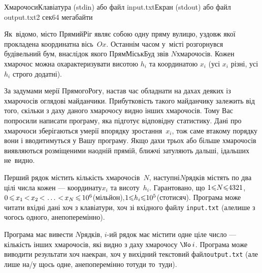 \vspace{10mm}\par
\begin{problem}{Хмарочоси}{Клавіатура (stdin) або файл input.txt}{Екран (stdout) або файл output.txt}{2 сек}{64 мегабайти}

Як~відомо, місто Прямий\nolinebreak[2] Ріг являє собою одну пряму вулицю, уздовж якої прокладена координатна вісь~$Ox$. Останнім часом у~місті розгорнувся будівельний бум, внаслідок якого ПрямМіськБуд звів $N$\nolinebreak[3] хмарочосів. Кожен хмарочос можна охарактеризувати висотою $h_i$ та координатою $x_i$ (усі $x_i$ різні, усі $h_i$ строго додатні).

За задумами мерії Прямого\nolinebreak[2] Рогу, настав час обладнати на дахах деяких із хмарочосів оглядові майданчики. Прибутковість такого майданчику залежить від того, скільки з даху даного хмарочосу видно інших хмарочосів. Тому Вас попросили написати програму, яка підготує відповідну статистику. Дані про хмарочоси зберігаються у\nolinebreak[3] мерії в\nolinebreak[3] порядку зростання~$x_i$, тож саме в\nolinebreak[3] такому порядку вони і вводитимуться у Вашу програму. Якщо дахи трьох або більше хмарочосів виявляються розміщеними на\nolinebreak[2] одній прямій, ближчі затуляють дальші, і\nolinebreak[3] дальших не~видно.

\InputFile
Перший рядок містить кількість хмарочосів~$N$, наступні\nolinebreak[2] $N$\nolinebreak[3] рядків містять по два цілі числа кожен --- координату\nolinebreak[3] $x_i$ та висоту~$h_i$. Гарантовано, що ${1{\leqslant}N{\leqslant}4321}$, $0\dib{{\<}}x_1\dib{{<}}x_2\dib{{<}}\dots\dib{{<}}x_N\dib{{\<}}10^6$\nolinebreak[3] (мільйон),\linebreak[2] ${1{\leqslant}h_i{\leqslant}10^5}$\nolinebreak[2] (сто\nolinebreak[3] тисяч). Програма може читати вхідні дані хоч з клавіатури, хоч зі вхідного файлу \verb"input.txt" (але\nolinebreak[2] лише з чогось одного, а\nolinebreak[3] не\nolinebreak[2] поперемінно).

\OutputFile
Програма має вивести $N$\nolinebreak[3] рядків, $i$-ий рядок має містити одне ціле число --- кількість інших хмарочосів, які видно з даху хмарочосу $\No\,i$. Програма може виводити результати хоч на\nolinebreak[3] екран, хоч у вихідний текстовий файл\nolinebreak[2] \verb"output.txt" (але лише на/у щось одне, а\nolinebreak[3] не\nolinebreak[2] поперемінно то\nolinebreak[3] туди то~туди).

\begin{minipage}{\textwidth}

\Example


\end{minipage}
\end{problem}
